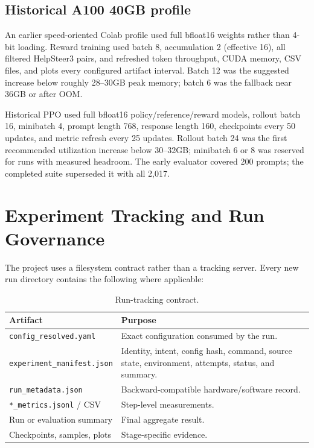 \documentclass[11pt]{article}
\begin{document}
\subsection{Historical A100 40GB profile}

An earlier speed-oriented Colab profile used full bfloat16 weights rather than
4-bit loading. Reward training used batch 8, accumulation 2 (effective 16),
all filtered HelpSteer3 pairs, and refreshed token throughput, CUDA memory,
CSV files, and plots every configured artifact interval. Batch 12 was the
suggested increase below roughly 28--30GB peak memory; batch 6 was the fallback
near 36GB or after OOM.

Historical PPO used full bfloat16 policy/reference/reward models, rollout batch
16, minibatch 4, prompt length 768, response length 160, checkpoints every 50
updates, and metric refresh every 25 updates. Rollout batch 24 was the first
recommended utilization increase below 30--32GB; minibatch 6 or 8 was reserved
for runs with measured headroom. The early evaluator covered 200 prompts;
the completed suite superseded it with all 2,017.

\section{Experiment Tracking and Run Governance}

The project uses a filesystem contract rather than a tracking server. Every
new run directory contains the following where applicable:

\begin{table}[H]
\centering
\caption{Run-tracking contract.}
\begin{tabularx}{0.94\textwidth}{@{}p{}Y@{}}
\toprule
\textbf{Artifact} & \textbf{Purpose}\\
\midrule
\texttt{config\_resolved.yaml} & Exact configuration consumed by the run.\\
\texttt{experiment\_manifest.json} & Identity, intent, config hash, command,
source state, environment, attempts, status, and summary.\\
\texttt{run\_metadata.json} & Backward-compatible hardware/software record.\\
\texttt{*\_metrics.jsonl} / CSV & Step-level measurements.\\
Run or evaluation summary & Final aggregate result.\\
Checkpoints, samples, plots & Stage-specific evidence.\\
\bottomrule
\end{tabularx}
\end{table}
\end{document}
